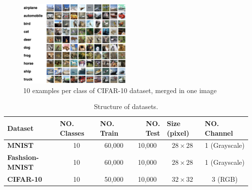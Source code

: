 \begin{figure}
  \centering
  \label{fig:cifar-10_dataset_example}
  \includegraphics[width=0.5\textwidth]{fig/cifar-10}
  \caption{10 examples per class of CIFAR-10 dataset, merged in one image \cite{CIFAR-10_dataset_reference}}
\end{figure}




\begin{table}[]
  \label{dataset_table}
  \begin{tabular}{
      l |
      c
      c
      c
      c
      c}
    \hline
    {\textbf{Dataset}}        & \multicolumn{1}{l}{{\textbf{NO. Classes}}} & \multicolumn{1}{l}{{\textbf{NO. Train}}} & \multicolumn{1}{r}{{\textbf{NO. Test}}} & \multicolumn{1}{l}{{\textbf{Size (pixel)}}} & \multicolumn{1}{l}{{\textbf{NO. Channel}}} \\ \hline
    {\textbf{MNIST}}          & 10                                         & 60,000
                              & 10,000                                     & $28\times28$                             & 1
    (Grayscale)                                                                                                                                                                                                                                            \\
    {\textbf{Fashsion-MNIST}} & 10                                         & 60,000
                              & 10,000                                     & $28\times28$
                              & 1 (Grayscale)                                                                                                                                                                                                              \\
    {\textbf{CIFAR-10}}       & 10                                         & 50,000
                              & 10,000                                     & $32\times32$                             & 3
    (RGB)                                                                                                                                                                                                                                                  \\ \hline
  \end{tabular}
  \caption{Structure of datasets.}
\end{table}


